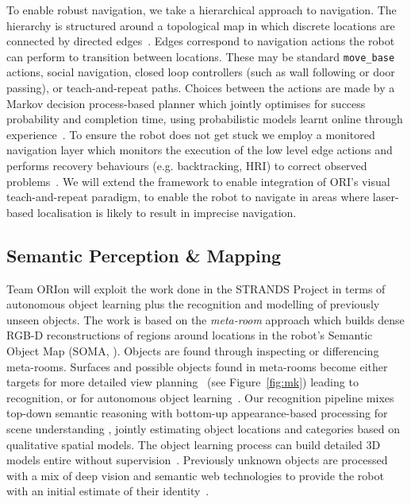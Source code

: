 \documentclass[runningheads,a4paper]{llncs}
\newcommand{\teamori}{Team ORIon}
\begin{document}
To enable robust navigation, we take a hierarchical approach to navigation. The hierarchy is structured around a topological map in which discrete locations are connected by directed edges~\cite{jpulido2015NowOrLater}. Edges correspond to navigation actions the robot can perform to transition between locations. These may be standard \texttt{move\_base} actions, social navigation, closed loop controllers (such as wall following or door passing), or teach-and-repeat paths. Choices between the actions are made by a Markov decision process-based planner which jointly optimises for success probability and completion time, using probabilistic models learnt online through experience~\cite{LPH14b}. To ensure the robot does not get stuck we employ a monitored navigation layer which monitors the execution of the low level edge actions and performs recovery behaviours (e.g. backtracking, HRI) to correct observed problems~\cite{strands@ram}. We will extend the framework to enable integration of ORI's visual teach-and-repeat paradigm, to enable the robot to navigate in areas where laser-based localisation is likely to result in imprecise navigation. 

\subsection{Semantic Perception \& Mapping}
\teamori{} will exploit the work done in the STRANDS Project in terms of autonomous object learning plus the recognition and modelling of previously unseen objects. The work is based on the \emph{meta-room} approach which builds dense RGB-D reconstructions of regions around locations in the robot's Semantic Object Map (SOMA, \cite{SOMA18_kunze}). Objects are found through inspecting or differencing meta-rooms. Surfaces and possible objects found in meta-rooms become either targets for more detailed view planning~\cite{kunze14indirect,kunze17ecmr} (see Figure~\ref{fig:mk}) leading to recognition, or for autonomous object learning~\cite{Faeulhammer:2016}. Our recognition pipeline mixes top-down semantic reasoning with bottom-up appearance-based processing for scene understanding \cite{kunze14topdown}, jointly estimating object locations and categories based on qualitative spatial models\cite{kunze14bootstrapping}. The object learning process can build detailed 3D models entire without supervision~\cite{Faeulhammer:2016}. Previously unknown objects are processed with a mix of deep vision and semantic web technologies to provide the robot with an initial estimate of their identity~\cite{aloof@icra17}.
\end{document}
